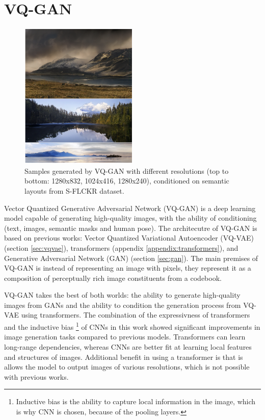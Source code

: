 \section{VQ-GAN}
\label{sec:vqgan}

\begin{figure}
    \centering
    \includegraphics[width=0.5\textwidth]{images/vqgan_samples.png}
    \caption{Samples generated by VQ-GAN with different resolutions (top to bottom: 1280x832, 1024x416, 1280x240), conditioned on semantic layouts from S-FLCKR dataset.}
\end{figure}

Vector Quantized Generative Adversarial Network (VQ-GAN) \cite{vqgan} is a deep learning model capable of generating high-quality images, with the ability of conditioning (text, images, semantic masks and human pose). The architecutre of VQ-GAN is based on previous works: Vector Quantized Variational Autoencoder (VQ-VAE) \cite{vqvae} (section \ref{sec:vqvae}), transformers \cite{transformer} (appendix \ref{appendix:transformers}), and Generative Adversarial Network (GAN) \cite{gan} (section \ref{sec:gan}). The main premises of VQ-GAN is instead of representing an image with pixels, they represent it as a composition of perceptually rich image constituents from a codebook.

VQ-GAN takes the best of both worlds: the ability to generate high-quality images from GANs and the ability to condition the generation process from VQ-VAE using transformers. The combination of the expressivness of transformers and the inductive bias \footnote[1]{Inductive bias is the ability to capture local information in the image, which is why CNN is chosen,  because of the pooling layers.} of CNNs \cite{cnn} in this work showed significant improvements in image generation tasks compared to previous models. Transformers can learn long-range dependencies, whereas CNNs are better fit at learning local features and structures of images. Additional benefit in using a transformer is that is allows the model to output images of various resolutions, which is not possible with previous works.

